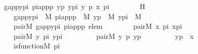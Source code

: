 \begin{isabellebody}
\ \ \isamarkupfalse%
\ \isamarkupfalse%
\ g{\isacharunderscore}{\kern0pt}app{\isacharunderscore}{\kern0pt}y{\isacharunderscore}{\kern0pt}pi\ pi{\isacharunderscore}{\kern0pt}app{\isacharunderscore}{\kern0pt}p\ y{\isacharunderscore}{\kern0pt}p\ y{\isacharunderscore}{\kern0pt}pi\ y\ p\ x\ pi\ \ \isanewline
\ \ \ \ \ \ H\ {\isacharcolon}{\kern0pt}\ \isanewline
\ \ \ \ \ \ \ \ {\isachardoublequoteopen}g{\isacharunderscore}{\kern0pt}app{\isacharunderscore}{\kern0pt}y{\isacharunderscore}{\kern0pt}pi\ {\isasymin}\ M{\isachardoublequoteclose}\ {\isachardoublequoteopen}pi{\isacharunderscore}{\kern0pt}app{\isacharunderscore}{\kern0pt}p\ {\isasymin}\ M{\isachardoublequoteclose}\ {\isachardoublequoteopen}y{\isacharunderscore}{\kern0pt}p\ {\isasymin}\ M{\isachardoublequoteclose}\ {\isachardoublequoteopen}y{\isacharunderscore}{\kern0pt}pi\ {\isasymin}\ M{\isachardoublequoteclose}\ \isanewline
\ \ \ \ \ \ \ \ {\isachardoublequoteopen}pair{\isacharparenleft}{\kern0pt}{\isacharhash}{\kern0pt}{\isacharhash}{\kern0pt}M{\isacharcomma}{\kern0pt}\ g{\isacharunderscore}{\kern0pt}app{\isacharunderscore}{\kern0pt}y{\isacharunderscore}{\kern0pt}pi{\isacharcomma}{\kern0pt}\ pi{\isacharunderscore}{\kern0pt}app{\isacharunderscore}{\kern0pt}p{\isacharcomma}{\kern0pt}\ elem{\isacharparenright}{\kern0pt}{\isachardoublequoteclose}\isanewline
\ \ \ \ \ \ \ \ {\isachardoublequoteopen}pair{\isacharparenleft}{\kern0pt}{\isacharhash}{\kern0pt}{\isacharhash}{\kern0pt}M{\isacharcomma}{\kern0pt}\ x{\isacharcomma}{\kern0pt}\ pi{\isacharcomma}{\kern0pt}\ x{\isacharunderscore}{\kern0pt}pi{\isacharparenright}{\kern0pt}{\isachardoublequoteclose}\ \isanewline
\ \ \ \ \ \ \ \ {\isachardoublequoteopen}pair{\isacharparenleft}{\kern0pt}{\isacharhash}{\kern0pt}{\isacharhash}{\kern0pt}M{\isacharcomma}{\kern0pt}\ y{\isacharcomma}{\kern0pt}\ pi{\isacharcomma}{\kern0pt}\ y{\isacharunderscore}{\kern0pt}pi{\isacharparenright}{\kern0pt}{\isachardoublequoteclose}\ \isanewline
\ \ \ \ \ \ \ \ {\isachardoublequoteopen}pair{\isacharparenleft}{\kern0pt}{\isacharhash}{\kern0pt}{\isacharhash}{\kern0pt}M{\isacharcomma}{\kern0pt}\ y{\isacharcomma}{\kern0pt}\ p{\isacharcomma}{\kern0pt}\ y{\isacharunderscore}{\kern0pt}p{\isacharparenright}{\kern0pt}{\isachardoublequoteclose}\ \isanewline
\ \ \ \ \ \ \ \ {\isachardoublequoteopen}y{\isacharunderscore}{\kern0pt}p\ {\isasymin}\ x{\isachardoublequoteclose}\ \isanewline
\ \ \ \ \ \ \ \ {\isachardoublequoteopen}is{\isacharunderscore}{\kern0pt}function{\isacharparenleft}{\kern0pt}{\isacharhash}{\kern0pt}{\isacharhash}{\kern0pt}M{\isacharcomma}{\kern0pt}\ pi{\isacharparenright}{\kern0pt}{\isachardoublequoteclose}\isanewline

\end{isabellebody}
